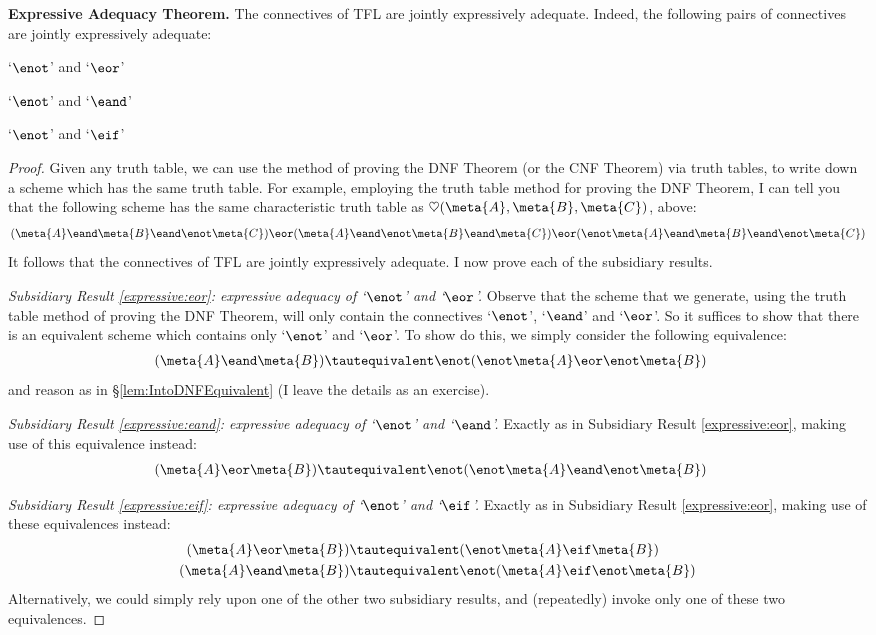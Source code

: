 	\begin{thm}\label{thm:ExpressiveAdequacy}\textbf{Expressive Adequacy Theorem.}
		The connectives of TFL are jointly expressively adequate. Indeed, the following pairs of connectives are jointly expressively adequate:
			\begin{earg}
				\item\label{expressive:eor} `$\enot$' and `$\eor$'
				\item\label{expressive:eand} `$\enot$' and `$\eand$'
				\item\label{expressive:eif} `$\enot$' and `$\eif$'
			\end{earg}
			\begin{proof}
				Given any truth table, we can use the method of proving the DNF Theorem (or the CNF Theorem) via truth tables, to write down a scheme which has the same truth table. For example, employing the truth table method for proving the DNF Theorem, I can tell you that the following scheme has the same characteristic truth table as $\heartsuit(\meta{A},\meta{B},\meta{C})$, above:
		$$(\meta{A} \eand \meta{B} \eand \enot \meta{C}) \eor (\meta{A} \eand \enot\meta{B} \eand \meta{C}) \eor (\enot \meta{A} \eand \meta{B} \eand \enot \meta{C})$$			
			It follows that the connectives of TFL are jointly expressively adequate. I now prove each of the subsidiary results.
	
				\emph{Subsidiary Result \ref{expressive:eor}: expressive adequacy of `$\enot$' and `$\eor$'.} Observe that the scheme that we generate, using the truth table method of proving the DNF Theorem, will only contain the connectives `$\enot$', `$\eand$' and `$\eor$'. So it suffices to show that there is an equivalent scheme which contains only `$\enot$' and `$\eor$'. To show do this, we simply consider the following equivalence:
		\begin{align*}
		(\meta{A} \eand \meta{B}) &\tautequivalent \enot(\enot \meta{A} \eor\enot \meta{B})
		\end{align*}
		and reason as in \S\ref{lem:IntoDNFEquivalent} (I leave the details as an exercise).

		\emph{Subsidiary Result \ref{expressive:eand}: expressive adequacy of `$\enot$' and `$\eand$'.} Exactly as in Subsidiary Result \ref{expressive:eor}, making use of this equivalence instead:
		\begin{align*}
		(\meta{A} \eor \meta{B}) &\tautequivalent \enot(\enot \meta{A} \eand\enot \meta{B})
		\end{align*}

			\emph{Subsidiary Result \ref{expressive:eif}: expressive adequacy of `$\enot$' and `$\eif$'.} 		Exactly as in Subsidiary Result \ref{expressive:eor}, making use of these equivalences instead:
		\begin{align*}
		(\meta{A} \eor \meta{B}) &\tautequivalent (\enot \meta{A} \eif\meta{B})\\
		(\meta{A} \eand \meta{B}) &\tautequivalent \enot(\meta{A} \eif \enot\meta{B})
		\end{align*}
		Alternatively, we could simply rely upon one of the other two subsidiary results, and (repeatedly) invoke only one of these two equivalences.
		\end{proof}
	\end{thm}\noindent
